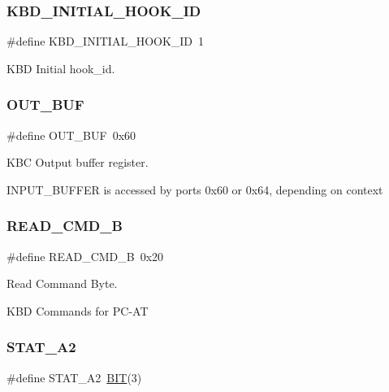 \subsubsection{\texorpdfstring{K\+B\+D\+\_\+\+I\+N\+I\+T\+I\+A\+L\+\_\+\+H\+O\+O\+K\+\_\+\+ID}{KBD\_INITIAL\_HOOK\_ID}}
{\footnotesize\ttfamily \#define K\+B\+D\+\_\+\+I\+N\+I\+T\+I\+A\+L\+\_\+\+H\+O\+O\+K\+\_\+\+ID~1}



K\+BD Initial hook\+\_\+id. 

\hypertarget{group__i8042_gacfb42dde389e8ca36ab267002fbf5c6a}{}\label{group__i8042_gacfb42dde389e8ca36ab267002fbf5c6a} 
\subsubsection{\texorpdfstring{O\+U\+T\+\_\+\+B\+UF}{OUT\_BUF}}
{\footnotesize\ttfamily \#define O\+U\+T\+\_\+\+B\+UF~0x60}



K\+BC Output buffer register. 

I\+N\+P\+U\+T\+\_\+\+B\+U\+F\+F\+ER is accessed by ports 0x60 or 0x64, depending on context \hypertarget{group__i8042_ga3c8f3d570f82da1110d0f57effa3112f}{}\label{group__i8042_ga3c8f3d570f82da1110d0f57effa3112f} 
\subsubsection{\texorpdfstring{R\+E\+A\+D\+\_\+\+C\+M\+D\+\_\+B}{READ\_CMD\_B}}
{\footnotesize\ttfamily \#define R\+E\+A\+D\+\_\+\+C\+M\+D\+\_\+B~0x20}



Read Command Byte. 

K\+BD Commands for P\+C-\/\+AT \hypertarget{group__i8042_gac284fb8ee0414487d8385d02f288cc4b}{}\label{group__i8042_gac284fb8ee0414487d8385d02f288cc4b} 
\subsubsection{\texorpdfstring{S\+T\+A\+T\+\_\+\+A2}{STAT\_A2}}
{\footnotesize\ttfamily \#define S\+T\+A\+T\+\_\+\+A2~\hyperlink{group___serial_ga3a8ea58898cb58fc96013383d39f482c}{B\+IT}(3)}

